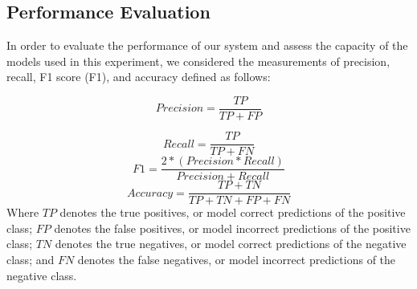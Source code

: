\documentclass[sn-mathphys,Numbered]{sn-jnl}%
\begin{document}
\subsection{Performance Evaluation}
In order to evaluate the performance of our system and assess the capacity of the models used in this experiment, we considered the measurements of precision, recall, F1 score (F1), and accuracy defined as follows:





\begin{equation}
     Precision =\frac{TP}{TP+FP}%
     \end{equation}

\begin{equation}
     Recall = \frac{TP}{TP+FN}%
    \end{equation}
\begin{equation}
 F1 = \frac{2*(Precision * Recall)}{Precision + Recall}%
\end{equation}
\begin{equation}
     Accuracy = \frac{TP+TN}{TP+TN+FP+FN}%
 \end{equation}
Where $TP$ denotes the true positives, or model correct predictions of the positive class; $FP$ denotes the false positives, or model incorrect predictions of the positive class; $TN$ denotes the true negatives, or model correct predictions of the negative class; and $FN$ denotes the false negatives, or model incorrect predictions of the negative class.


\end{document}
